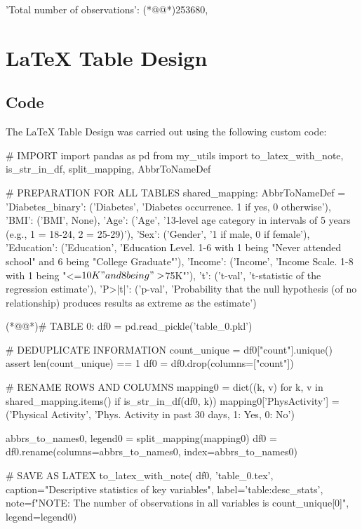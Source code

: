 \documentclass[11pt]{article}
\begin{document}
\begin{codeoutput}
{
    'Total number of observations': (*@@*)253680,
}
\end{codeoutput}

\section{LaTeX Table Design}
\subsection{{Code}}
The LaTeX Table Design was carried out using the following custom code:

\begin{python}


# IMPORT
import pandas as pd
from my_utils import to_latex_with_note, is_str_in_df, split_mapping, AbbrToNameDef

# PREPARATION FOR ALL TABLES
shared_mapping: AbbrToNameDef = {
    'Diabetes_binary': ('Diabetes', 'Diabetes occurrence. 1 if yes, 0 otherwise'),
    'BMI': ('BMI', None),
    'Age': ('Age', '13-level age category in intervals of 5 years (e.g., 1 = 18-24, 2 = 25-29)'),
    'Sex': ('Gender', '1 if male, 0 if female'),
    'Education': ('Education', 'Education Level. 1-6 with 1 being "Never attended school" and 6 being "College Graduate"'),
    'Income': ('Income', 'Income Scale. 1-8 with 1 being "<=$10K" and 8 being ">$75K"'),
    't': ('t-val', 't-statistic of the regression estimate'),
    'P>|t|': ('p-val', 'Probability that the null hypothesis (of no relationship) produces results as extreme as the estimate')
}

(*@@*)# TABLE 0:
df0 = pd.read_pickle('table_0.pkl')

# DEDUPLICATE INFORMATION 
count_unique = df0["count"].unique()
assert len(count_unique) == 1
df0 = df0.drop(columns=["count"])

# RENAME ROWS AND COLUMNS 
mapping0 = dict((k, v) for k, v in shared_mapping.items() if is_str_in_df(df0, k)) 
mapping0['PhysActivity'] = ('Physical Activity', 'Phys. Activity in past 30 days, 1: Yes, 0: No')

abbrs_to_names0, legend0 = split_mapping(mapping0)
df0 = df0.rename(columns=abbrs_to_names0, index=abbrs_to_names0)

# SAVE AS LATEX
to_latex_with_note(
    df0, 'table_0.tex',
    caption="Descriptive statistics of key variables", 
    label='table:desc_stats',
    note=f"NOTE: The number of observations in all variables is {count_unique[0]}",
    legend=legend0)


\end{python}
\end{document}
